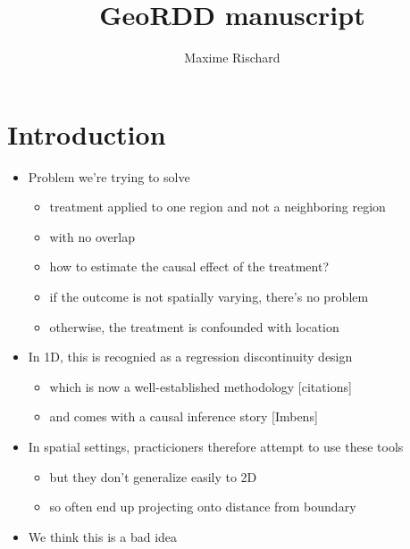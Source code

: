 \documentclass[letter]{article}
\title{GeoRDD manuscript}
\author{Maxime Rischard}
\providecommand{\tightlist}{%
      \setlength{\itemsep}{0pt}\setlength{\parskip}{0pt}}
\providecommand{\tightlist}{%
  	  \setlength{\itemsep}{0pt}\setlength{\parskip}{0pt}}
\begin{document}
    
    
    
    \maketitle
    
    
	\tableofcontents


    





    	\section{Introduction}\label{introduction}

\begin{itemize}
\tightlist
\item
  Problem we're trying to solve

  \begin{itemize}
  \tightlist
  \item
    treatment applied to one region and not a neighboring region
  \item
    with no overlap
  \item
    how to estimate the causal effect of the treatment?
  \item
    if the outcome is not spatially varying, there's no problem
  \item
    otherwise, the treatment is confounded with location
  \end{itemize}
\item
  In 1D, this is recognied as a regression discontinuity design

  \begin{itemize}
  \tightlist
  \item
    which is now a well-established methodology {[}citations{]}
  \item
    and comes with a causal inference story {[}Imbens{]}
  \end{itemize}
\item
  In spatial settings, practicioners therefore attempt to use these tools

  \begin{itemize}
  \tightlist
  \item
    but they don't generalize easily to 2D
  \item
    so often end up projecting onto distance from boundary
  \end{itemize}
\item
  We think this is a bad idea


\end{itemize}
\end{document}
